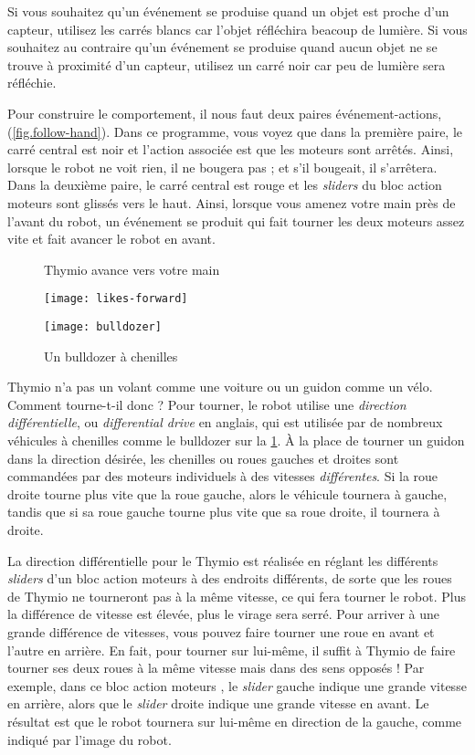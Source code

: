 Si vous souhaitez qu'un événement se produise quand un objet est proche d'un capteur, utilisez les carrés blancs car l'objet 
réfléchira beacoup de lumière.
Si vous souhaitez au contraire qu'un événement se produise
quand aucun objet ne se trouve à proximité d'un capteur,
utilisez un carré noir car peu de lumière sera réfléchie.

Pour construire le comportement, il nous faut deux paires événement-actions, (\cref{fig.follow-hand}).
Dans ce programme, vous voyez que dans la première paire, le carré central est noir et l'action associée est que les moteurs sont arrêtés.
Ainsi, lorsque le robot ne voit rien, il ne bougera pas ; et s'il bougeait, il s'arrêtera.
Dans la deuxième paire, le carré central est rouge et les \textit{sliders} du bloc action moteurs sont glissés vers le haut.
Ainsi, lorsque vous amenez votre main près de l'avant du robot, un événement se produit qui fait tourner les deux moteurs assez vite et fait avancer le robot en avant.


\begin{figure}
\begin{floatrow}
	\ffigbox
	{\caption{Thymio avance vers votre main}\label{fig.follow-hand}}
	{\texttt{[image: likes-forward]}}
	\ffigbox
	{\caption{Un bulldozer à chenilles}\label{fig.bull}}
	{\texttt{[image: bulldozer]}}
\end{floatrow}
\end{figure}


Thymio n'a pas un volant comme une voiture ou un guidon comme un vélo.
Comment tourne-t-il donc ? 
Pour tourner, le robot utilise une \emph{direction différentielle}, ou \emph{differential drive} en anglais, qui est  utilisée par de nombreux véhicules à chenilles comme le bulldozer sur la \cref{fig.bull}.
À la place de tourner un guidon dans la direction désirée, les chenilles ou roues gauches et droites sont commandées par des moteurs individuels à des vitesses \emph{différentes}.
Si la roue droite tourne plus vite que la roue gauche, alors le véhicule tournera à gauche, tandis que si sa roue gauche tourne plus vite que sa roue droite, il tournera à droite.

La direction différentielle pour le Thymio est réalisée 
en réglant les différents \textit{sliders} d'un bloc action moteurs à des endroits différents, de sorte que les roues de Thymio ne tourneront pas à la même vitesse, ce qui fera tourner le robot.
Plus la différence de vitesse est élevée, plus le virage sera serré.
Pour arriver à une grande différence de vitesses, vous pouvez faire tourner une roue en avant et l'autre en arrière.
En fait, pour tourner sur lui-même, il suffit à Thymio de faire tourner ses deux roues à la même vitesse mais dans des sens opposés !
Par exemple, dans ce bloc action moteurs , le \textit{slider} gauche indique une grande vitesse en arrière, alors que le \textit{slider} droite indique une grande vitesse en avant.
Le résultat est que le robot tournera sur lui-même en direction de la gauche, comme indiqué par l'image du robot.

